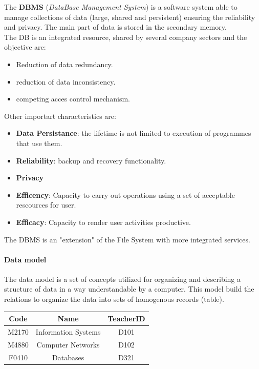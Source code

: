 \documentclass[12pt]{article}
\begin{document}
The \textbf{DBMS} (\textit{DataBase Management System}) is a software system able to manage collections of data (large, shared and persistent) ensuring the reliability and privacy. The main part of data is stored in the secondary memory.\\
The DB is an integrated resource, shared by several company sectors and the objective are:
\begin{itemize}
  \item Reduction of data redundancy.
  \item reduction of data inconsistency.
  \item competing acces control mechanism.
\end{itemize}
Other importart characteristics are:
\begin{itemize}
  \item \textbf{Data Persistance}: the lifetime is not limited to execution of programmes that use them.
  \item \textbf{Reliability}: backup and recovery functionality.
  \item \textbf{Privacy}
  \item \textbf{Efficency}: Capacity to carry out operations using a set of acceptable rescources for user.
  \item \textbf{Efficacy}: Capacity to render user activities productive.
\end{itemize}

The DBMS is an "extension" of the File System with more integrated services.

\paragraph{Data model}
The data model is a set of concepts utilized for organizing and describing a structure of data in a way understandable by a computer. This model build the relations to organize the data into sets of homogenous records (table).

\begin{center}
\begin{tabular}{ |c|c|c| }
 \hline
 \textbf{Code} & \textbf{Name} & \textbf{TeacherID} \\
 \hline
 \hline
 M2170 & Information Systems & D101\\
 \hline
 M4880 & Computer Networks & D102\\
 \hline
 F0410 & Databases & D321\\
 \hline
\end{tabular}
\end{center}
\end{document}
